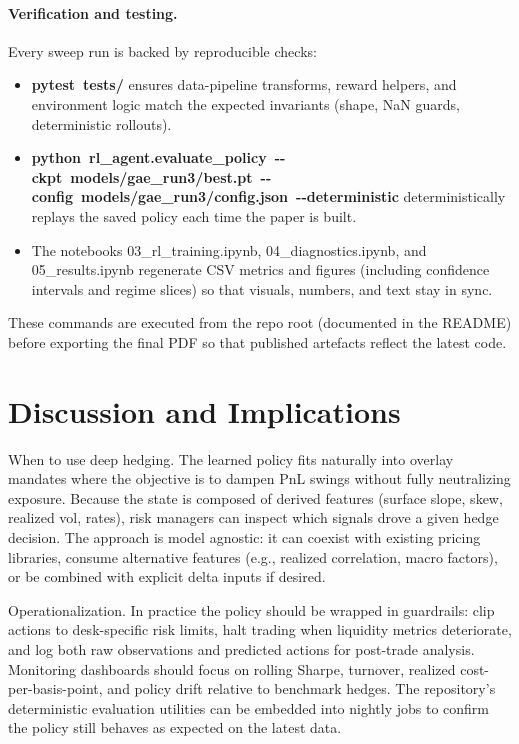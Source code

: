 \documentclass[,11pt,letterpaper,twocolumn]{article}
\providecommand{\tightlist}{\setlength{\itemsep}{0pt}\setlength{\parskip}{0pt}}
\begin{document}
\paragraph{Verification and testing.} Every sweep run is backed by
reproducible checks:

\begin{itemize}
\tightlist
\item
  \textbf{pytest\ tests/} ensures data-pipeline transforms, reward
  helpers, and environment logic match the expected invariants (shape,
  NaN guards, deterministic rollouts).
\item
  \textbf{python\ rl\_agent.evaluate\_policy\ -\/-ckpt\ models/gae\_run3/best.pt\ -\/-config\ models/gae\_run3/config.json\ -\/-deterministic}
  deterministically replays the saved policy each time the paper is
  built.
\item
  The notebooks 03\_rl\_training.ipynb, 04\_diagnostics.ipynb, and 05\_results.ipynb
  regenerate CSV metrics and figures (including confidence intervals and
  regime slices) so that visuals, numbers, and text stay in sync.
\end{itemize}

These commands are executed from the repo root (documented in the
README) before exporting the final PDF so that published artefacts
reflect the latest code.

\section{Discussion and Implications}\label{discussion-and-implications}

When to use deep hedging. The learned policy fits naturally into overlay
mandates where the objective is to dampen PnL swings without fully
neutralizing exposure. Because the state is composed of derived
features (surface slope, skew, realized vol, rates), risk managers can
inspect which signals drove a given hedge decision. The approach is
model agnostic: it can coexist with existing pricing libraries, consume
alternative features (e.g., realized correlation, macro factors), or be
combined with explicit delta inputs if desired.

Operationalization. In practice the policy should be wrapped in
guardrails: clip actions to desk-specific risk limits, halt trading when
liquidity metrics deteriorate, and log both raw observations and
predicted actions for post-trade analysis. Monitoring dashboards should
focus on rolling Sharpe, turnover, realized cost-per-basis-point, and
policy drift relative to benchmark hedges. The repository's
deterministic evaluation utilities can be embedded into nightly jobs to
confirm the policy still behaves as expected on the latest data.
\end{document}

